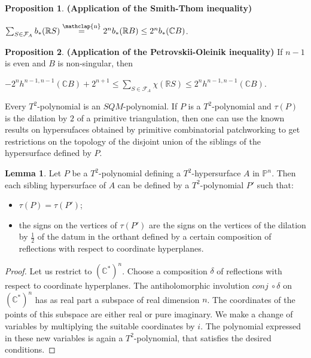 \documentclass[12pt]{article}
\newcommand\customeq{\stackrel{\mathclap{\normalfont\scriptsize\mbox{n}}}{=}}
\renewcommand{\P}{\mathbb{P}}
\theoremstyle{definition}
\newtheorem{lem}{Lemma}[section]
\newtheorem{prop}{Proposition}[section]
\begin{document}
\begin{prop}
    \textbf{(Application of the Smith-Thom inequality)} 
    \begin{center}
    $\sum_{S \in \mathcal{F}_A} b_*(\mathbb{R}S) \customeq 2^n b_*(\mathbb{R}B) \leq 2^n b_*(\mathbb{C}B)$. \qedsymbol \end{center} 
\end{prop}
\begin{prop}
    \textbf{(Application of the Petrovskii-Oleinik inequality)} If $n-1$ is even and $B$ is non-singular, then 
    \begin{center}$-2^nh^{n-1,n-1} (\mathbb{C}B)+ 2^{n+1} \leq \sum_{S \in \mathcal{F}_A} \chi(\mathbb{R}S) \leq 2^nh^{n-1,n-1} (\mathbb{C}B)$.\qedsymbol \end{center} 
\end{prop}

\begin{sloppypar}
    Every $T^2$-polynomial is an $SQM$-polynomial. If $P$ is a $T^2$-polynomial and $\tau(P)$ is the dilation by $2$ of a primitive triangulation, then one can use the known results on hypersufaces obtained by primitive combinatorial patchworking to get restrictions on the topology of the disjoint union of the siblings of the hypersurface defined by $P$.
\end{sloppypar}

\begin{lem}
    Let $P$ be a $T^2$-polynomial defining a $T^2$-hypersurface $A$ in $\P^n$. Then each sibling hypersurface of $A$ can be defined by a $T^2$-polynomial $P'$ such that:
    \begin{itemize}
        \item $\tau(P) = \tau(P')$;
        \item the signs on the vertices of $\tau(P')$ are the signs on the vertices of the dilation by $\frac{1}{2}$ of the datum in the orthant defined by a certain composition of reflections with respect to coordinate hyperplanes.
    \end{itemize}
\end{lem}

\begin{proof}
    Let us restrict to $(\mathbb{C}^*)^n$. Choose a composition $\delta$ of reflections with respect to coordinate hyperplanes. The antiholomorphic involution $conj \:\circ \delta$ on $(\mathbb{C}^*)^n$ has as real part a subspace of real dimension $n$. %
    The coordinates of the points of this subspace are either real or pure imaginary. 
    We make a change of variables by multiplying the suitable coordinates by $i$. The polynomial expressed in these new variables is again a $T^2$-polynomial, that satisfies the desired conditions.
\end{proof}
\end{document}

